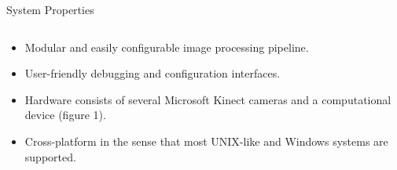 \documentclass[final,hyperref={pdfpagelabels=false}]{beamer}
\begin{document}
\begin{frame}[t]
\begin{columns}[t]
\begin{column}{.465\textwidth}


\begin{block}{
\vspace*{-0.002\textheight}
System Properties
}
	\begin{columns} %
		\begin{column}{.54\textwidth} %
			\begin{itemize}
				\item Modular and easily configurable image processing pipeline.
				\item User-friendly debugging and configuration interfaces.
				
				\item Hardware consists of several Microsoft Kinect cameras and a computational device (figure 1).			
				\item Cross-platform in  the sense that most UNIX-like and Windows systems are supported.
			\end{itemize}
		\end{column}
			

\end{columns}
\end{block}
\end{column}
\end{columns}
\end{frame}
\end{document}
